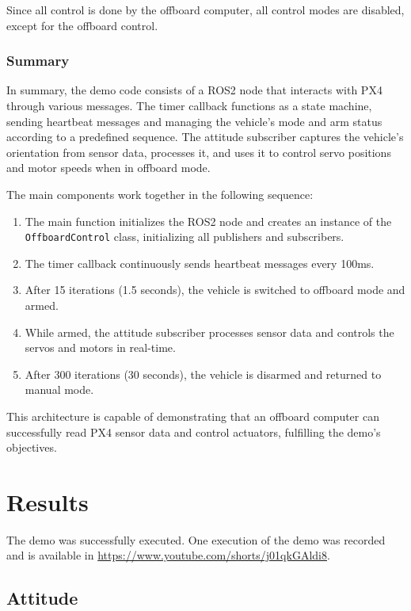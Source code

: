 \documentclass[a4paper]{article}
\begin{document}
Since all control is done by the offboard computer, all control modes are disabled, except for the offboard control. 

\subsubsection{Summary}

In summary, the demo code consists of a ROS2 node that interacts with PX4 through various messages. The timer callback functions as a state machine, sending heartbeat messages and managing the vehicle's mode and arm status according to a predefined sequence. The attitude subscriber captures the vehicle's orientation from sensor data, processes it, and uses it to control servo positions and motor speeds when in offboard mode.

The main components work together in the following sequence:

\begin{enumerate}
    \item The main function initializes the ROS2 node and creates an instance of the \verb|OffboardControl| class, initializing all publishers and subscribers. 
    \item The timer callback continuously sends heartbeat messages every 100ms. 
    \item After 15 iterations (1.5 seconds), the vehicle is switched to offboard mode and armed. 
    \item While armed, the attitude subscriber processes sensor data and controls the servos and motors in real-time. 
    \item After 300 iterations (30 seconds), the vehicle is disarmed and returned to manual mode. 
\end{enumerate}

This architecture is capable of demonstrating that an offboard computer can successfully read PX4 sensor data and control actuators, fulfilling the demo's objectives.



\clearpage
\section{Results}

The demo was successfully executed. One execution of the demo was recorded and is available in \url{https://www.youtube.com/shorts/j01qkGAldi8}. 

\subsection{Attitude}
\end{document}
